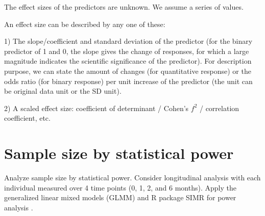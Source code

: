\documentclass[12pt]{article}
\begin{document}
The effect sizes of the predictors are unknown. We assume a series of values. 


An effect size can be described by any one of these: 

1) The slope/coefficient and standard deviation of the predictor (for the binary predictor of 1 and 0, the slope gives the change of responses, for which a large magnitude indicates the scientific significance of the predictor). For description purpose, we can state the amount of changes (for quantitative response) or the odds ratio (for binary response) per unit increase of the predictor (the unit can be original data unit or the SD unit). 

2) A scaled effect size: coefficient of determinant / Cohen's $f^2$ / correlation coefficient, etc.

 
\section{Sample size by statistical power}

%
%
% 
%





Analyze sample size by statistical power. Consider longitudinal analysis with each individual measured over 4 time points (0, 1, 2, and 6 months). Apply the generalized linear mixed models (GLMM) and R package SIMR for power analysis \citep{green2016simr}. 
\end{document}
